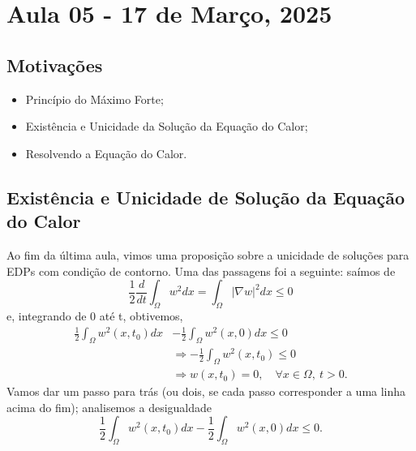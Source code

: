 \documentclass[../pde_notes.tex]{subfiles}
\begin{document}
\section{Aula 05 - 17 de Março, 2025}
\subsection{Motivações}
\begin{itemize}
	\item Princípio do Máximo Forte;
	\item Existência e Unicidade da Solução da Equação do Calor;
	\item Resolvendo a Equação do Calor.
\end{itemize}
\subsection{Existência e Unicidade de Solução da Equação do Calor}
Ao fim da última aula, vimos uma proposição sobre a unicidade de soluções para EDPs com condição de contorno. Uma das passagens foi a seguinte: saímos de
\[
	\frac{1}{2} \frac{d}{dt}\int_{\Omega }^{}w^{2}dx = \int_{\Omega }^{}|\nabla w|^{2}dx \leq 0
\]
e, integrando de 0 até t, obtivemos,
\begin{align*}
	\frac{1}{2}\int_{\Omega }^{}w^{2}(x, t_{0})dx & - \frac{1}{2}\int_{\Omega }^{}w^{2}(x, 0)dx \leq 0             \\
	                                              & \Rightarrow -\frac{1}{2}\int_{\Omega }^{}w^{2}(x, t_{0})\leq 0 \\
	                                              & \Rightarrow w(x, t_{0}) = 0,\quad \forall x\in \Omega ,\: t>0.
\end{align*}
Vamos dar um passo para trás (ou dois, se cada passo corresponder a uma linha acima do fim); analisemos a desigualdade
\[
	\frac{1}{2}\int_{\Omega }^{}w^{2}(x, t_{0})dx - \frac{1}{2}\int_{\Omega }^{}w^{2}(x, 0)dx \leq 0.
\]
\end{document}
